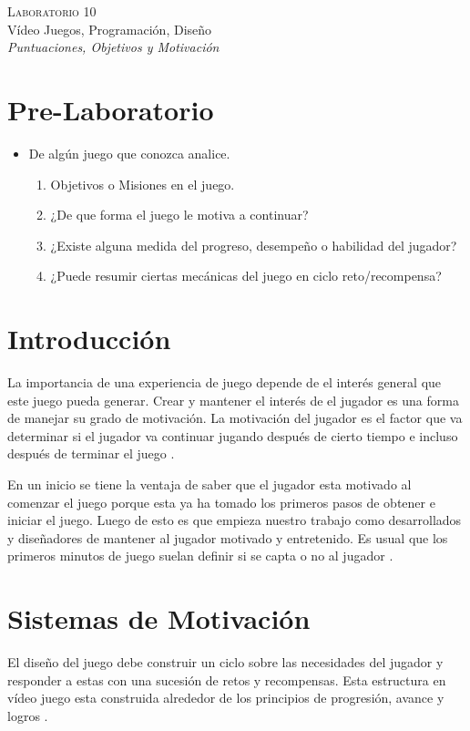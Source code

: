 \begin{center}
\textsc{\Large Laboratorio 10}~\\
{\large Vídeo Juegos, Programación, Diseño}~\\
\emph{Puntuaciones, Objetivos y Motivación}
\end{center}

\section{Pre-Laboratorio}
\begin{itemize}
\item De algún juego que conozca analice.
\begin{enumerate}
  \item Objetivos o Misiones en el juego.
  \item ¿De que forma el juego le motiva a continuar?
  \item ¿Existe alguna medida del progreso, desempeño o habilidad del jugador?
  \item ¿Puede resumir ciertas mecánicas del juego en ciclo reto/recompensa?
\end{enumerate}
\end{itemize}

\section{Introducción}
La importancia de una experiencia de juego depende de el interés general que este juego pueda generar. Crear y mantener el interés de el jugador es una forma de manejar su grado de motivación. La motivación del jugador es el factor que va determinar si el jugador va continuar jugando después de cierto tiempo e incluso después de terminar el juego \cite[p.~75]{jenkinscreatinggames}.

En un inicio se tiene la ventaja de saber que el jugador esta motivado al comenzar el juego porque esta ya ha tomado los primeros pasos de obtener e iniciar el juego. Luego de esto es que empieza nuestro trabajo como desarrollados y diseñadores de mantener al jugador motivado y entretenido. Es usual que los primeros minutos de juego suelan definir si se capta o no al jugador \cite{motivationdesign}.
\section{Sistemas de Motivación}
El diseño del juego debe construir un ciclo sobre las necesidades del jugador y responder a estas con una sucesión de retos y recompensas. Esta estructura en vídeo juego esta construida alrededor de los principios de progresión, avance y logros \cite{motivationdesign}.

